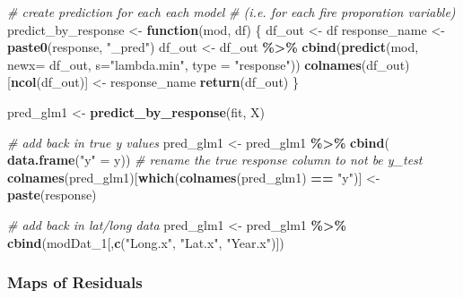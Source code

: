 \documentclass[
]{article}
\newenvironment{Shaded}{\begin{snugshade}}{\end{snugshade}}
\newcommand{\AttributeTok}[1]{\textcolor[rgb]{0.13,0.29,0.53}{#1}}
\newcommand{\CommentTok}[1]{\textcolor[rgb]{0.56,0.35,0.01}{\textit{#1}}}
\newcommand{\ControlFlowTok}[1]{\textcolor[rgb]{0.13,0.29,0.53}{\textbf{#1}}}
\newcommand{\FunctionTok}[1]{\textcolor[rgb]{0.13,0.29,0.53}{\textbf{#1}}}
\newcommand{\NormalTok}[1]{#1}
\newcommand{\OtherTok}[1]{\textcolor[rgb]{0.56,0.35,0.01}{#1}}
\newcommand{\SpecialCharTok}[1]{\textcolor[rgb]{0.81,0.36,0.00}{\textbf{#1}}}
\newcommand{\StringTok}[1]{\textcolor[rgb]{0.31,0.60,0.02}{#1}}
\begin{document}
\begin{Shaded}
\begin{Highlighting}[]
  \CommentTok{\# create prediction for each each model}
\CommentTok{\# (i.e. for each fire proporation variable)}
\NormalTok{predict\_by\_response }\OtherTok{\textless{}{-}} \ControlFlowTok{function}\NormalTok{(mod, df) \{}
\NormalTok{  df\_out }\OtherTok{\textless{}{-}}\NormalTok{ df}
\NormalTok{  response\_name }\OtherTok{\textless{}{-}} \FunctionTok{paste0}\NormalTok{(response, }\StringTok{"\_pred"}\NormalTok{)}
\NormalTok{  df\_out }\OtherTok{\textless{}{-}}\NormalTok{ df\_out }\SpecialCharTok{\%\textgreater{}\%} \FunctionTok{cbind}\NormalTok{(}\FunctionTok{predict}\NormalTok{(mod, }\AttributeTok{newx=}\NormalTok{ df\_out, }\AttributeTok{s=}\StringTok{"lambda.min"}\NormalTok{, }\AttributeTok{type =} \StringTok{"response"}\NormalTok{))}
   \FunctionTok{colnames}\NormalTok{(df\_out)[}\FunctionTok{ncol}\NormalTok{(df\_out)] }\OtherTok{\textless{}{-}}\NormalTok{ response\_name}
  \FunctionTok{return}\NormalTok{(df\_out)}
\NormalTok{\}}

\NormalTok{pred\_glm1 }\OtherTok{\textless{}{-}} \FunctionTok{predict\_by\_response}\NormalTok{(fit, X)}

\CommentTok{\# add back in true y values}
\NormalTok{pred\_glm1 }\OtherTok{\textless{}{-}}\NormalTok{ pred\_glm1 }\SpecialCharTok{\%\textgreater{}\%} 
  \FunctionTok{cbind}\NormalTok{( }\FunctionTok{data.frame}\NormalTok{(}\StringTok{"y"} \OtherTok{=}\NormalTok{ y))}
\CommentTok{\# rename the true response column to not be \textquotesingle{}y\_test\textquotesingle{} }
\FunctionTok{colnames}\NormalTok{(pred\_glm1)[}\FunctionTok{which}\NormalTok{(}\FunctionTok{colnames}\NormalTok{(pred\_glm1) }\SpecialCharTok{==} \StringTok{"y"}\NormalTok{)] }\OtherTok{\textless{}{-}} \FunctionTok{paste}\NormalTok{(response)}

\CommentTok{\# add back in lat/long data }
\NormalTok{pred\_glm1 }\OtherTok{\textless{}{-}}\NormalTok{ pred\_glm1 }\SpecialCharTok{\%\textgreater{}\%} 
  \FunctionTok{cbind}\NormalTok{(modDat\_1[,}\FunctionTok{c}\NormalTok{(}\StringTok{"Long.x"}\NormalTok{, }\StringTok{"Lat.x"}\NormalTok{, }\StringTok{"Year.x"}\NormalTok{)])}
\end{Highlighting}
\end{Shaded}

\subsubsection{Maps of Residuals}\label{maps-of-residuals}
\end{document}
